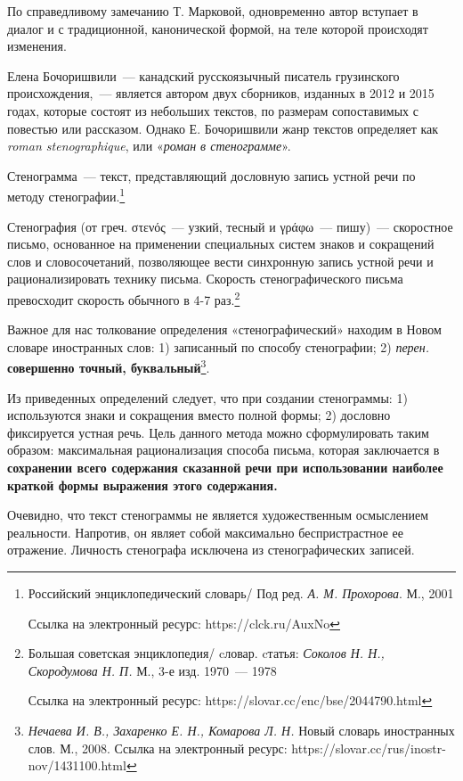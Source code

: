 \documentclass{kursa4}
\begin{document}
    По справедливому замечанию Т. Марковой, одновременно автор вступает
    в диалог и с традиционной, канонической формой, на теле которой
    происходят изменения. 

    Елена Бочоришвили~--- канадский русскоязычный писатель грузинского
    происхождения,~--- является автором двух сборников, изданных в 2012 и
    2015 годах, которые состоят из небольших текстов, по размерам
    сопоставимых с повестью или рассказом. Однако Е. Бочоришвили жанр
    текстов определяет как \textit{roman stenographique}, или
    «\textit{роман в стенограмме}». 

    {Стенограмма~--- текст, представляющий дословную
    запись устной речи по методу
    стенографии.}\footnote{{Российский энциклопедический
    словарь/ Под ред. \textit{А. М. Прохорова}. М., 2001 }\par
    {Ссылка на электронный ресурс:
    https://clck.ru/AuxNo}}

    {Стенография}\textbf{{ }}(от греч.
    στενός~--- узкий, тесный и γράφω~--- пишу)~--- скоростное письмо, основанное
    на применении специальных систем знаков и сокращений слов и
    словосочетаний, позволяющее вести синхронную запись устной речи и
    рационализировать технику письма. Скорость стенографического письма
    превосходит скорость обычного в 4-7
    раз.\footnote{{Большая советская энциклопедия/ cловар. cтатья: \textit{Соколов Н. Н., Скородумова Н. П.} М., 3-е изд. 1970~--- 1978}\par{Ссылка на электронный ресурс: https://slovar.cc/enc/bse/2044790.html}}

    Важное для нас толкование определения «стенографический» находим в Новом
    словаре иностранных слов{: }1) записанный по способу
    стенографии; 2) \textit{перен.} \textbf{совершенно точный,
    буквальный}\footnote{\textit{{Нечаева И. В., Захаренко
    Е. Н., Комарова Л. Н. }}{Новый словарь иностранных
    слов. М., 2008. Ссылка на электронный ресурс:
    https://slovar.cc/rus/inostr-nov/1431100.html}}. 

    Из приведенных определений следует, что при создании стенограммы: 1)
    используются знаки и сокращения вместо полной формы; 2) дословно
    фиксируется устная речь. Цель данного метода можно сформулировать таким
    образом: максимальная рационализация способа письма, которая
    заключается в \textbf{сохранении всего содержания сказанной речи при
    использовании наиболее краткой формы выражения этого содержания.} 

    Очевидно, что текст стенограммы не является художественным
    осмыслением реальности. Напротив, он являет собой максимально
    беспристрастное ее отражение. Личность стенографа исключена из
    стенографических записей. 
\end{document}

